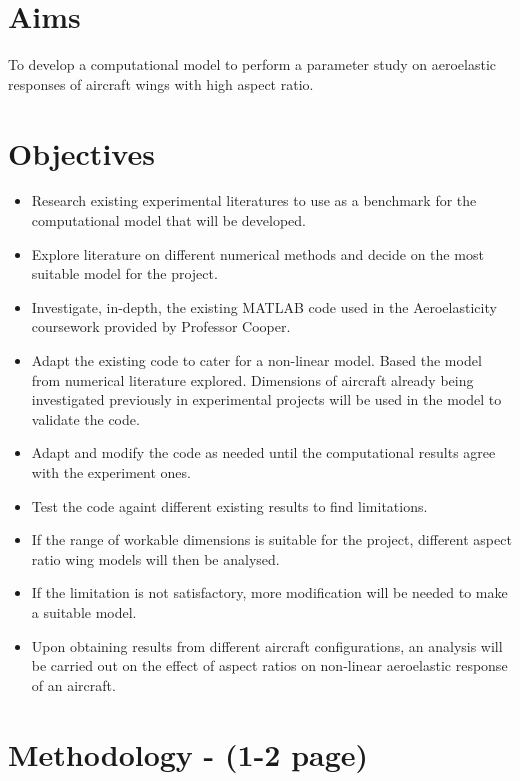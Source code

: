 \documentclass[11pt]{article}
\begin{document}
\section*{Aims}
To develop a computational model to perform a parameter study on aeroelastic responses of aircraft wings with high aspect ratio.

\section*{Objectives} 
\begin{itemize}
    \item Research existing experimental literatures to use as a benchmark for the computational model that will be developed. 
    \item Explore literature on different numerical methods and decide on the most suitable model for the project. 
    \item Investigate, in-depth, the existing MATLAB code used in the Aeroelasticity coursework provided by Professor Cooper.
    \item Adapt the existing code to cater for a non-linear model. Based the model from numerical literature explored. Dimensions of aircraft already being investigated previously in experimental projects will be used in the model to validate the code.
   \item Adapt and modify the code as needed until the computational results agree with the experiment ones.
    \item Test the code againt different existing results to find limitations.
    \item If the range of workable dimensions is suitable for the project, different aspect ratio wing models will then be analysed.
    \item If the limitation is not satisfactory, more modification will be needed to make a suitable model.
    \item Upon obtaining results from different aircraft configurations, an analysis will be carried out on the effect of aspect ratios on non-linear aeroelastic response of an aircraft.
    
\end{itemize}


\section{Methodology - (1-2 page)}
\end{document}
